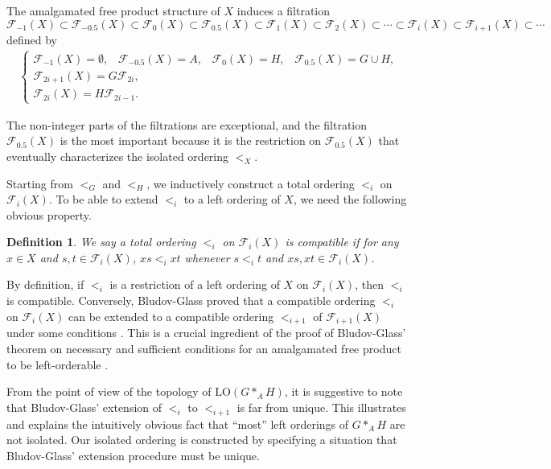 \documentclass[10pt]{amsart}
\newtheorem{definition}[theorem]{Definition}}
\numberwithin{equation}{section}
\begin{document}
The amalgamated free product structure of $X$ induces a filtration 
\[ {\mathcal{F}}_{-1}(X) \subset {\mathcal{F}}_{-0.5}(X) \subset {\mathcal{F}}_{0}(X) \subset {\mathcal{F}}_{0.5}(X) \subset {\mathcal{F}}_{1}(X) \subset {\mathcal{F}}_{2}(X)\subset \cdots \subset {\mathcal{F}}_{i}(X) \subset {\mathcal{F}}_{i+1}(X) \subset \cdots\]
defined by
\begin{gather*}
\begin{cases}
{\mathcal{F}}_{-1}(X)=\emptyset, \;\;\; {\mathcal{F}}_{-0.5}(X)=A, \;\;\; {\mathcal{F}}_{0}(X) = H, \;\;\; {\mathcal{F}}_{0.5}(X)= G \cup H, \\
{\mathcal{F}}_{2i+1}(X) = G {\mathcal{F}}_{2i},\\
{\mathcal{F}}_{2i}(X) = H {\mathcal{F}}_{2i-1}.
\end{cases}
\end{gather*}

The non-integer parts of the filtrations are exceptional, and the filtration ${\mathcal{F}}_{0.5}(X)$ is the most important because it is the restriction on ${\mathcal{F}}_{0.5}(X)$ that eventually characterizes the isolated ordering $<_{X}$.

Starting from $<_{G}$ and $<_{H}$, we inductively construct a total ordering $<_{i}$ on ${\mathcal{F}}_{i}(X)$. To be able to extend $<_{i}$ to a left ordering of $X$, we need the following obvious property.

\begin{definition}
We say a total ordering $<_{i}$ on ${\mathcal{F}}_{i}(X)$ is \emph{compatible} if for any $x \in X$ and $s,t \in {\mathcal{F}}_{i}(X)$, $xs <_{i} xt$ whenever $s<_{i} t$ and $xs, xt \in {\mathcal{F}}_{i}(X)$. 
\end{definition}

By definition, if $<_{i}$ is a restriction of a left ordering of $X$ on ${\mathcal{F}}_{i}(X)$, then $<_{i}$ is compatible. Conversely, Bludov-Glass proved that a compatible ordering $<_{i}$ on ${\mathcal{F}}_{i}(X)$ can be extended to a compatible ordering $<_{i+1}$ of ${\mathcal{F}}_{i+1}(X)$ under some conditions \cite{bg}. This is a crucial ingredient of the proof of Bludov-Glass' theorem on necessary and sufficient conditions for an amalgamated free product to be left-orderable \cite[Theorem A]{bg}.

From the point of view of the topology of ${\textrm{LO}}(G*_{A}H)$, it is suggestive to note that Bludov-Glass' extension of $<_{i}$ to $<_{i+1}$ is far from unique. This illustrates and explains the intuitively obvious fact that ``most'' left orderings of $G*_{A} H$ are not isolated. Our isolated ordering is constructed by specifying a situation that Bludov-Glass' extension procedure must be unique.
\end{document}
